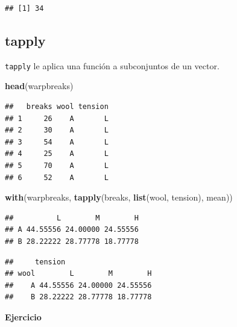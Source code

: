 \documentclass[]{article}
\newenvironment{Shaded}{\begin{snugshade}}{\end{snugshade}}
\newcommand{\KeywordTok}[1]{\textcolor[rgb]{0.13,0.29,0.53}{\textbf{{#1}}}}
\newcommand{\DataTypeTok}[1]{\textcolor[rgb]{0.13,0.29,0.53}{{#1}}}
\newcommand{\NormalTok}[1]{{#1}}
\begin{document}
\begin{verbatim}
## [1] 34
\end{verbatim}

\subsection{tapply}\label{tapply}

\texttt{tapply} le aplica una función a subconjuntos de un vector.

\begin{Shaded}
\begin{Highlighting}[]
\KeywordTok{head}\NormalTok{(warpbreaks)}
\end{Highlighting}
\end{Shaded}

\begin{verbatim}
##   breaks wool tension
## 1     26    A       L
## 2     30    A       L
## 3     54    A       L
## 4     25    A       L
## 5     70    A       L
## 6     52    A       L
\end{verbatim}

\begin{Shaded}
\begin{Highlighting}[]
\KeywordTok{with}\NormalTok{(warpbreaks, }\KeywordTok{tapply}\NormalTok{(breaks, }\KeywordTok{list}\NormalTok{(wool, tension), mean))}
\end{Highlighting}
\end{Shaded}

\begin{verbatim}
##          L        M        H
## A 44.55556 24.00000 24.55556
## B 28.22222 28.77778 18.77778
\end{verbatim}

\begin{Shaded}
\end{Shaded}

\begin{verbatim}
##     tension
## wool        L        M        H
##    A 44.55556 24.00000 24.55556
##    B 28.22222 28.77778 18.77778
\end{verbatim}

\textbf{Ejercicio}
\end{document}
